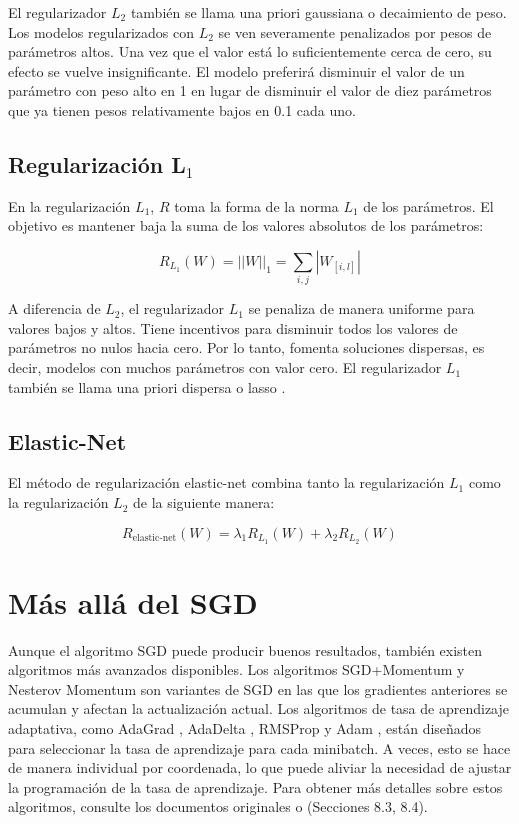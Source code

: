 El regularizador $L_2$ también se llama una priori gaussiana o decaimiento de peso. Los modelos regularizados con $L_2$ se ven severamente penalizados por pesos de parámetros altos. Una vez que el valor está lo suficientemente cerca de cero, su efecto se vuelve insignificante. El modelo preferirá disminuir el valor de un parámetro con peso alto en 1 en lugar de disminuir el valor de diez parámetros que ya tienen pesos relativamente bajos en 0.1 cada uno.

\subsection{Regularización L$_1$}
En la regularización $L_1$, $R$ toma la forma de la norma $L_1$ de los parámetros. El objetivo es mantener baja la suma de los valores absolutos de los parámetros:

\begin{displaymath}
R_{L_{1}}(W) = ||W||_{1} = \sum_{i,j} |W_{[i,l]}|
\end{displaymath}

A diferencia de $L_2$, el regularizador $L_1$ se penaliza de manera uniforme para valores bajos y altos. Tiene incentivos para disminuir todos los valores de parámetros no nulos hacia cero. Por lo tanto, fomenta soluciones dispersas, es decir, modelos con muchos parámetros con valor cero. El regularizador $L_1$ también se llama una priori dispersa o lasso \cite{tibshirani1996regression}.

\subsection{Elastic-Net}
El método de regularización elastic-net \cite{zou2005regularization} combina tanto la regularización $L_1$ como la regularización $L_2$ de la siguiente manera:

\begin{displaymath}
R_{\text{elastic-net}}(W) = \lambda_1 R_{L_1}(W) + \lambda_2 R_{L_2}(W)
\end{displaymath}


\section{Más allá del SGD}
Aunque el algoritmo SGD puede producir buenos resultados, también existen algoritmos más avanzados disponibles. Los algoritmos SGD+Momentum \cite{polyak1964some} y Nesterov Momentum \cite{nesterov2018lectures,sutskever2013importance} son variantes de SGD en las que los gradientes anteriores se acumulan y afectan la actualización actual. Los algoritmos de tasa de aprendizaje adaptativa, como AdaGrad \cite{duchi2011adaptive}, AdaDelta \cite{zeiler2012adadelta}, RMSProp \cite{tieleman2012lecture} y Adam \cite{kingma2014adam}, están diseñados para seleccionar la tasa de aprendizaje para cada minibatch. A veces, esto se hace de manera individual por coordenada, lo que puede aliviar la necesidad de ajustar la programación de la tasa de aprendizaje. Para obtener más detalles sobre estos algoritmos, consulte los documentos originales o \cite{goodfellow2016deep} (Secciones 8.3, 8.4).


